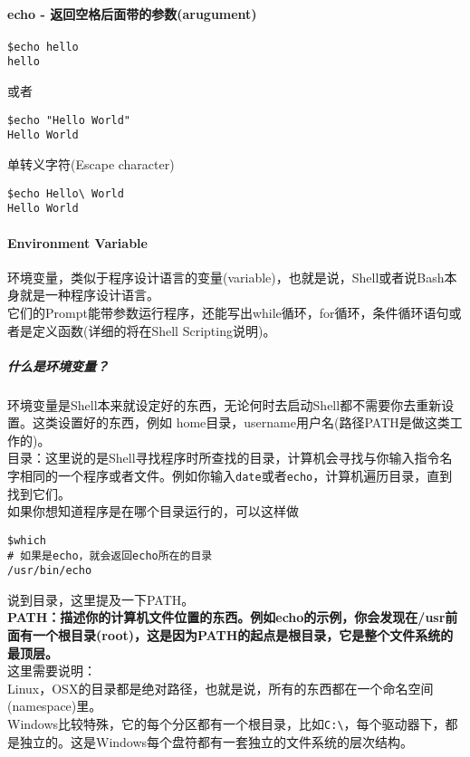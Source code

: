 \documentclass[
]{article}
\begin{document}
\hypertarget{echo---ux8fd4ux56deux7a7aux683cux540eux9762ux5e26ux7684ux53c2ux6570arugument}{%
\paragraph{echo -
返回空格后面带的参数(arugument)}\label{echo---ux8fd4ux56deux7a7aux683cux540eux9762ux5e26ux7684ux53c2ux6570arugument}}

\begin{verbatim}
$echo hello
hello
\end{verbatim}

或者

\begin{verbatim}
$echo "Hello World"
Hello World
\end{verbatim}

单转义字符(Escape character)

\begin{verbatim}
$echo Hello\ World
Hello World
\end{verbatim}

\hypertarget{environment-variable}{%
\paragraph{Environment Variable}\label{environment-variable}}

环境变量，类似于程序设计语言的变量(variable)，也就是说，Shell或者说Bash本身就是一种程序设计语言。\\
它们的Prompt能带参数运行程序，还能写出while循环，for循环，条件循环语句或者是定义函数(详细的将在Shell
Scripting说明)。

\hypertarget{ux4ec0ux4e48ux662fux73afux5883ux53d8ux91cf}{%
\subparagraph{什么是环境变量？}\label{ux4ec0ux4e48ux662fux73afux5883ux53d8ux91cf}}

环境变量是Shell本来就设定好的东西，无论何时去启动Shell都不需要你去重新设置。这类设置好的东西，例如
home目录，username用户名(路径PATH是做这类工作的)。\\
目录：这里说的是Shell寻找程序时所查找的目录，计算机会寻找与你输入指令名字相同的一个程序或者文件。例如你输入\texttt{date}或者\texttt{echo}，计算机遍历目录，直到找到它们。\\
如果你想知道程序是在哪个目录运行的，可以这样做

\begin{verbatim}
$which
# 如果是echo，就会返回echo所在的目录
/usr/bin/echo
\end{verbatim}

说到目录，这里提及一下PATH。\\
\textbf{PATH：描述你的计算机文件位置的东西。例如echo的示例，你会发现在/usr前面有一个根目录(root)，这是因为PATH的起点是根目录，它是整个文件系统的最顶层。}\\
这里需要说明：\\
Linux，OSX的目录都是绝对路径，也就是说，所有的东西都在一个命名空间(namespace)里。\\
Windows比较特殊，它的每个分区都有一个根目录，比如\texttt{C:\textbackslash{}}，每个驱动器下，都是独立的。这是Windows每个盘符都有一套独立的文件系统的层次结构。
\end{document}
